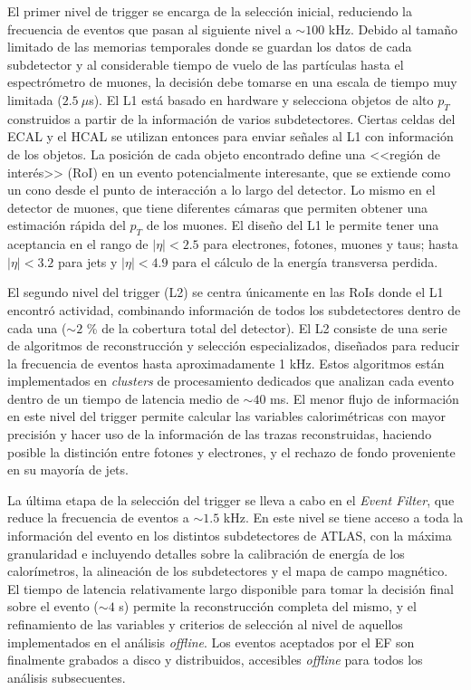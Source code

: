 El primer nivel de trigger se encarga de la selección inicial, reduciendo la frecuencia de eventos que pasan al siguiente nivel a $\sim100$ kHz. Debido al tamaño limitado de las memorias temporales donde se guardan los datos de cada subdetector y al considerable tiempo de vuelo de las partículas hasta el espectrómetro de muones, la decisión debe tomarse en una escala de tiempo muy limitada ($2.5 \:\mu$s). El L1 está basado en hardware y selecciona objetos de alto $p_{T}$ construidos a partir de la información de varios subdetectores. Ciertas celdas del ECAL y el HCAL se utilizan entonces para enviar señales al L1 con información de los objetos. La posición de cada objeto encontrado define una <<región de interés>> (RoI) en un evento potencialmente interesante, que se extiende como un
cono desde el punto de interacción a lo largo del detector. Lo mismo en el detector de muones, que tiene diferentes cámaras que permiten obtener una estimación rápida del $p_{T}$ de los muones. El diseño del L1 le permite tener una aceptancia en el rango de $|\eta|<2.5$ para electrones, fotones, muones y taus; hasta $|\eta|<3.2$ para jets y $|\eta|<4.9$ para el cálculo de la energía transversa perdida.


El segundo nivel del trigger (L2) se centra únicamente en las RoIs donde el L1 encontró actividad, combinando información de todos los subdetectores dentro de cada una ($\sim2$ \% de la cobertura total del detector). El L2 consiste de una serie de algoritmos de reconstrucción y selección especializados, diseñados para reducir la frecuencia de eventos hasta aproximadamente 1 kHz. Estos algoritmos están implementados en \textit{clusters} de procesamiento dedicados que analizan cada evento dentro de un tiempo de latencia medio de $\sim40$ ms. El menor flujo de información en este nivel del trigger permite calcular las variables calorimétricas con mayor precisión y hacer uso de la información de las trazas reconstruidas, haciendo posible la distinción entre fotones y electrones, y el rechazo de fondo proveniente en su mayoría de jets.

La última etapa de la selección del trigger se lleva a cabo en el \textit{Event Filter}, que reduce la frecuencia de eventos a $\sim 1.5$ kHz. En este nivel se tiene acceso a toda la información del evento en los distintos subdetectores de ATLAS, con la máxima granularidad e incluyendo detalles sobre la calibración de energía de los calorímetros, la alineación de los subdetectores y el mapa de campo magnético. El tiempo de latencia relativamente largo disponible para tomar la decisión final sobre el evento ($\sim4$ s) permite la reconstrucción completa del mismo, y el refinamiento de las variables y criterios de selección al nivel de aquellos implementados en el análisis \textit{offline}. Los eventos aceptados por el EF son finalmente grabados a disco y distribuidos, accesibles \textit{offline} para todos los análisis subsecuentes.

